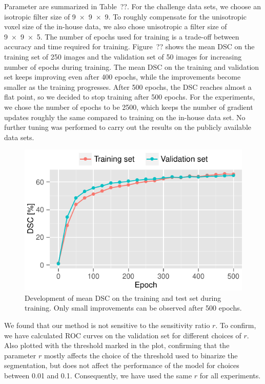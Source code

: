 Parameter are summarized in Table~??. For the challenge data sets, we choose an
isotropic filter size of \num{9x9x9}. To roughly compensate for the unisotropic
voxel size of the in-house data, we also chose unisotropic a filter size of
\num{9x9x5}. The number of epochs used for training is a trade-off between
accuracy and time required for training. Figure~?? shows the mean DSC on the
training set of 250 images and the validation set of 50 images for increasing
number of epochs during training. The mean DSC on the training and validation
set keeps improving even after 400 epochs, while the improvements become smaller
as the training progresses. After 500 epochs, the DSC reaches almost a flat
point, so we decided to stop training after 500 epochs. For the experiments, we
chose the number of epochs to be 2500, which keeps the number of gradient
updates roughly the same compared to training on the in-house data set. No
further tuning was performed to carry out the results on the publicly available
data sets.
\begin{figure}
\centering
\includegraphics[width=0.9\columnwidth]{figures/ems_progress}
\caption{Development of mean DSC on the training and test set during training.
Only small improvements can be observed after 500 epochs.}
\end{figure}

We found that our method is not sensitive to the sensitivity ratio $r$. To
confirm, we have calculated ROC curves on the validation set for different
choices of $r$. Also plotted with the threshold marked in the plot, confirming
that the parameter $r$ mostly affects the choice of the threshold used to
binarize the segmentation, but does not affect the performance of the model for
choices between 0.01 and 0.1. Consequently, we have used the same $r$ for all
experiments.

